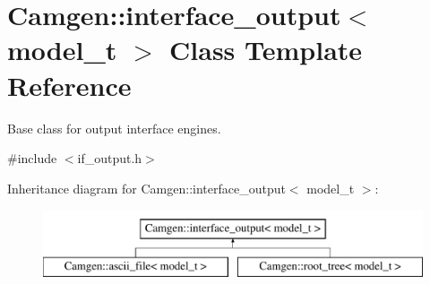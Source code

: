 \hypertarget{a00319}{}\section{Camgen\+:\+:interface\+\_\+output$<$ model\+\_\+t $>$ Class Template Reference}
\label{a00319}


Base class for output interface engines.  




{\ttfamily \#include $<$if\+\_\+output.\+h$>$}

Inheritance diagram for Camgen\+:\+:interface\+\_\+output$<$ model\+\_\+t $>$\+:\begin{figure}[H]
\begin{center}
\leavevmode
\includegraphics[height=2.000000cm]{a00319}
\end{center}
\end{figure}

